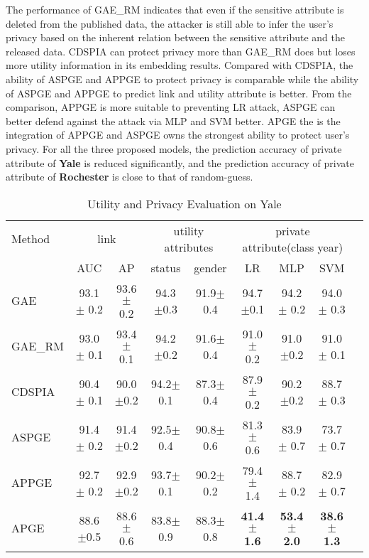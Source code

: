 \documentclass{article}
\begin{document}
The performance of GAE\_RM indicates that even if the sensitive attribute is deleted from the published data, the attacker is still able to infer the user's privacy based on the inherent relation between the sensitive attribute and the released data.
CDSPIA can protect privacy more than GAE\_RM does but loses more utility information in its embedding results.
Compared with CDSPIA, the ability of ASPGE and APPGE to protect privacy is comparable while the ability of ASPGE and APPGE to predict link and utility attribute is better.
From the comparison, APPGE is more suitable to preventing LR attack, ASPGE can better defend against the attack via MLP and SVM better.  APGE the is the integration of APPGE and ASPGE owns the strongest ability to protect user's privacy.  For all the three proposed models, the prediction accuracy of private attribute of {\bf Yale} is reduced significantly, and the prediction accuracy of private attribute of {\bf Rochester} is close to that of random-guess.
%
\begin{table}
\small
  \caption{Utility and Privacy Evaluation on Yale}
  \label{Tab:Yale}
  \centering
  \begin{tabular}{lcccccccc}
    \toprule
     Method & \multicolumn{2}{c}{link} & \multicolumn{2}{c}{utility attributes} &\multicolumn{3}{c}{private attribute(class year)}                  \\
    \cmidrule(r){2-3} \cmidrule(r){4-5} \cmidrule(r){6-8}
       & AUC  &AP     &status &gender  &LR  &MLP &SVM  \\
    \midrule
    GAE & 93.1 $\pm$ 0.2 &93.6$\pm$ 0.2     &94.3 $\pm$0.3  &91.9$\pm$ 0.4  &94.7 $\pm$0.1 &94.2$\pm$  0.2 &94.0$\pm$ 0.3\\
    GAE\_RM    &93.0 $\pm$ 0.1 &93.4$\pm$ 0.1  &94.2 $\pm$0.2   &91.6$\pm$ 0.4  &91.0$\pm$ 0.2 &91.0 $\pm$0.2 &91.0$\pm$ 0.1   \\
    CDSPIA     &90.4 $\pm$  0.1    &90.0 $\pm$0.2  &94.2$\pm$ 0.1  &87.3$\pm$ 0.4 &87.9$\pm$ 0.2 &90.2 $\pm$0.2 &88.7$\pm$ 0.3 \\
    ASPGE     &91.4 $\pm$  0.2     & 91.4 $\pm$0.2  &92.5$\pm$ 0.4  &90.8$\pm$ 0.6 &81.3$\pm$ 0.6  &83.9$\pm$ 0.7 &73.7$\pm$ 0.7 \\
    APPGE    &92.7 $\pm$  0.2   &92.9 $\pm$0.2  &93.7$\pm$ 0.1  &90.2$\pm$ 0.2 &79.4$\pm$ 1.4 &88.7$\pm$ 0.2 &82.9$\pm$ 0.7\\
    APGE     &88.6   $\pm $0.5  &88.6$\pm$ 0.6  &83.8$\pm$ 0.9  &88.3$\pm$ 0.8 &\textbf{41.4$\pm$ 1.6} &\textbf{53.4$\pm$ 2.0} &\textbf{38.6$\pm$ 1.3}\\
    \bottomrule
  \end{tabular}
\end{table}
\end{document}
